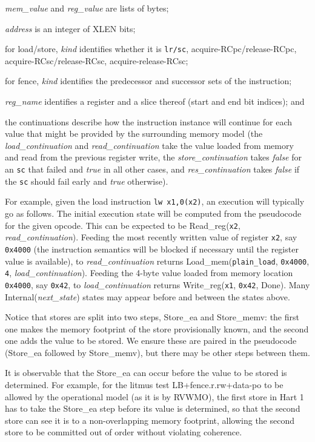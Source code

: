 \begin{tightlist}
\item {\it mem\_value} and {\it reg\_value} are lists of bytes;
\item {\it address} is an integer of XLEN bits;
\item for load/store, {\it kind} identifies whether it is {\tt lr/sc}, acquire-RCpc/release-RCpc, acquire-RCsc/release-RCsc, acquire-release-RCsc;
\item for fence, {\it kind} identifies the predecessor and successor sets of the instruction;
\item {\it reg\_name} identifies a register and a slice thereof (start and
  end bit indices); and
\item the continuations describe how the instruction instance will continue for each value that might be provided by the surrounding memory model (the {\it load\_continuation} and {\it read\_continuation} take the value loaded from memory and read from the previous register write, the {\it store\_continuation} takes {\it false} for an {\tt sc} that failed and {\it true} in all other cases, and {\it res\_continuation} takes {\it false} if the {\tt sc} should fail early and {\it true} otherwise).
\end{tightlist}

\begin{commentary}
For example, given the load instruction \verb!lw x1,0(x2)!,
an execution will typically go as follows.
The initial execution state will be computed from the pseudocode for the given opcode.
This can be expected to be {\sc Read\_reg}({\tt x2}, {\it read\_continuation}).
Feeding the most recently written value of register {\tt x2}, say {\tt 0x4000} (the instruction semantics will be blocked if necessary until the register value is available), to {\it read\_continuation} returns {\sc Load\_mem}({\tt plain\_load}, {\tt 0x4000}, {\tt 4}, {\it load\_continuation}).
Feeding the 4-byte value loaded from memory location {\tt 0x4000}, say {\tt 0x42}, to {\it load\_continuation} returns
{\sc Write\_reg}({\tt x1}, {\tt 0x42}, {\sc Done}).
Many {\sc Internal}({\it next\_state}) states may appear before and between the states above.
\end{commentary}

Notice that stores are split into two steps, {\sc Store\_ea} and {\sc Store\_memv}: the first one makes the memory footprint of the store provisionally known, and the second one adds the value to be stored.
We ensure these are paired in the pseudocode ({\sc Store\_ea} followed by {\sc Store\_memv}), but there may be other steps between them.
\begin{commentary}
It is observable that the {\sc Store\_ea} can occur before the value to be stored is determined.
For example, for the litmus test LB+fence.r.rw+data-po to be allowed by the operational model (as it is by RVWMO), the first store in Hart 1 has to take the {\sc Store\_ea} step before its value is determined, so that the second store can see it is to a non-overlapping memory footprint, allowing the second store to be committed out of order without violating coherence.
\end{commentary}

